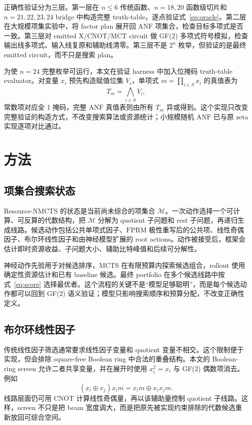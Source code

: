 \documentclass[UTF8,fontset=macnew,11pt]{ctexart}
\newcommand{\method}{Resource-NMCTS}
\newcommand{\anf}{\ensuremath{\mathrm{ANF}}}
\newcommand{\fprm}{\ensuremath{\mathrm{FPRM}}}
\newcommand{\mcts}{\ensuremath{\mathrm{MCTS}}}
\newcommand{\xor}{\ensuremath{\oplus}}
\newcommand{\mct}{\ensuremath{\mathrm{MCT}}}
\newcommand{\ttable}{truth-table}
\begin{document}
正确性验证分为三层。第一层在 $n\leq6$ 传统函数、$n=18,20$ 函数级切片和 $n=21,22,23,24$ bridge 中构造完整 \ttable{}，逐点验证式~\eqref{eq:oracle}。第二层在大规模项集实验中，将 factor plan 展开回 \anf{} 项集合，检查目标多项式是否一致。第三层对 emitted X/CNOT/\mct{} circuit 做 GF(2) 多项式符号模拟，检查输出线多项式、输入线复原和辅助线清零。第三层不是 $2^n$ 枚举，但验证的是最终 emitted circuit，而不只是搜索 plan。

为使 $n=24$ 完整枚举可运行，本文在验证 harness 中加入位掩码 truth-table evaluator。对变量 $x_i$ 预先构造赋值位集 $V_i$，单项式 $m=\prod_{i\in S}x_i$ 的真值表为
\begin{equation}
  T_m=\bigwedge_{i\in S}V_i ,
  \label{eq:truth-mask}
\end{equation}
常数项对应全 1 掩码，完整 \anf{} 真值表则由所有 $T_m$ 异或得到。这个实现只改变完整验证的构造方式，不改变搜索算法或资源统计；小规模随机 \anf{} 已与原 zeta 实现逐项对比通过。

\section{方法}

\subsection{项集合搜索状态}

\method{} 的状态是当前尚未综合的项集合 $\mathcal{M}$。一次动作选择一个可计算、可反算的代数结构，把 $\mathcal{M}$ 分解为 quotient 子问题和 rest 子问题，再递归生成线路。候选动作包括公共单项式因子、\fprm{} 极性重写后的公共项、线性奇偶因子、布尔环线性因子和由神经模型扩展的 root actions。动作被接受后，框架会估计即时资源收益、子问题大小、辅助比特峰值和后续可分解性。

神经动作先验用于对候选排序，\mcts{} 在有限预算内探索候选组合，rollout 使用确定性资源估计和已有 baseline 候选。最终 portfolio 在多个候选线路中按式~\eqref{eq:score} 选择最优者。这个流程的关键不是“模型足够聪明”，而是每个候选动作都可以回到 GF(2) 语义验证；模型只影响搜索顺序和预算分配，不改变正确性定义。

\subsection{布尔环线性因子}

传统线性因子筛选通常要求线性因子变量和 quotient 变量不相交。这个限制便于实现，但会排除 square-free Boolean ring 中合法的重叠结构。本文的 Boolean-ring screen 允许二者共享变量，并在展开时使用 $x_i^2=x_i$ 与 GF(2) 偶数项消去。例如
\begin{equation}
  (x_i\xor x_j)x_i m = x_i m \xor x_i x_j m .
  \label{eq:boolean-ring}
\end{equation}
线路层面仍可用 CNOT 计算线性奇偶量，再以该辅助量控制 quotient 子线路。这样，screen 不只是把 beam 宽度调大，而是把原先被实现约束排除的代数候选重新放回可综合空间。
\end{document}
